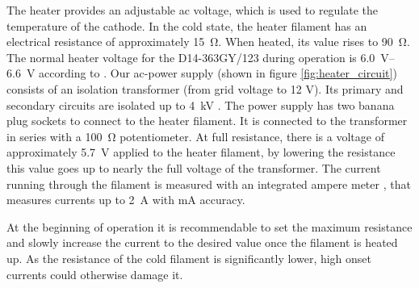 The heater provides an adjustable ac voltage, which is used to regulate the temperature of the cathode. In the cold state, the heater filament has an electrical resistance of approximately \SI{15}{\ohm}. When heated, its value rises to \SI{90}{\ohm}. The normal heater voltage for the D14-363GY/123 during  operation is \SIrange{6.0}{6.6}{\volt} according to \cite{D14363GY123-manual}. 
Our ac-power supply (shown in figure \ref{fig:heater_circuit}) consists of an isolation transformer (from grid voltage to 12 V). Its primary  and secondary circuits are isolated up to \SI{4}{\kilo\volt} \cite{DS44231-DataSheet}. The power supply has two  banana plug sockets to connect to the heater filament. 
It is connected to the transformer in series with a \SI{100}{\ohm} potentiometer. At full resistance, there is a voltage of approximately \SI{5.7}{\volt} applied to the heater filament, by lowering the resistance this value goes up to nearly the full voltage of the transformer. 
The current running through the filament is measured with an integrated ampere meter \cite{ACA-20PC-manual}, that measures currents up to  \SI{2}{\ampere} with \si{\milli\ampere} accuracy.

At the beginning of operation it is recommendable to set the maximum resistance and slowly increase the current to the desired value once the filament is heated up. As the resistance of the cold filament is significantly lower, high onset currents could otherwise damage it.  